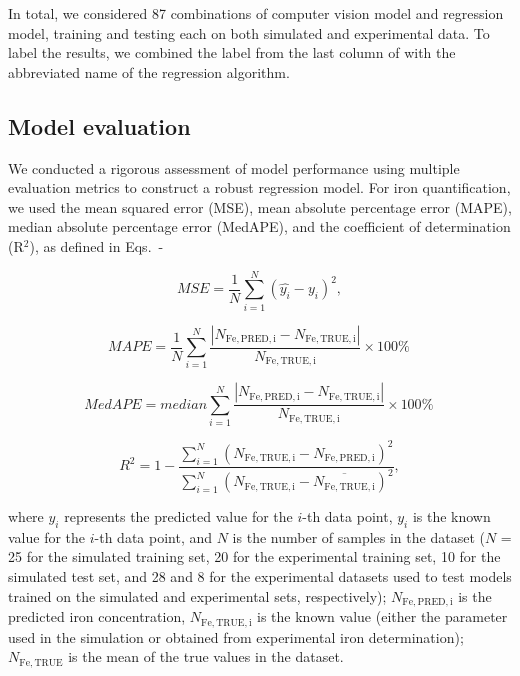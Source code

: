 \documentclass[10pt]{iopart}
\begin{document}
In total, we considered 87 combinations of computer vision model and regression model, training and testing each on both simulated and experimental data. 
To label the results, we combined the label from the last column of  with the abbreviated name of the regression algorithm.

\subsection{Model evaluation}\label{subsec:ModEva}

We conducted a rigorous assessment of model performance using multiple evaluation metrics to construct a robust regression model. 
For iron quantification, we used the mean squared error (MSE), mean absolute percentage error (MAPE), median absolute percentage error (MedAPE), and the coefficient of determination (R$^2$), as defined in Eqs.~-~

\begin{equation}\label{eqMSE}
  MSE = \frac{1}{N}\displaystyle\sum_{i=1}^{N} (\hat{y_i}-y_i)^2,
\end{equation}

\begin{equation}\label{eqMAPE}
  MAPE = \frac{1}{N}\displaystyle\sum_{i=1}^{N} \frac{|N_\mathrm{Fe,PRED,i}-N_\mathrm{Fe,TRUE,i}|}{N_\mathrm{Fe,TRUE,i}}\times 100 \%\,
\end{equation}

\begin{equation}\label{eqMedAPE}
  MedAPE = median\displaystyle\sum_{i=1}^{N} \frac{|N_\mathrm{Fe,PRED,i}-N_\mathrm{Fe,TRUE,i}|}{N_\mathrm{Fe,TRUE,i}}\times 100 \%\,
\end{equation}

\begin{equation}\label{eqR2}
  R^2 = 1-\frac{\displaystyle\sum_{i=1}^{N} (N_\mathrm{Fe,TRUE,i}-N_\mathrm{Fe,PRED,i})^2}{\displaystyle\sum_{i=1}^{N} (N_\mathrm{Fe,TRUE,i}-\overline{{N_\mathrm{Fe,TRUE,i}}})^2},
\end{equation}

where $\hat{y_i}$ represents the predicted value for the $i$-th data point, $y_i$ is the known value for the $i$-th data point, and $N$ is the number of samples in the dataset ($N$ = 25 for the simulated training set, 20 for the experimental training set, 10 for the simulated test set, and 28 and 8 for the experimental datasets used to test models trained on the simulated and experimental sets, respectively);
$N_\mathrm{Fe,PRED,i}$ is the predicted iron concentration, $N_\mathrm{Fe,TRUE,i}$ is the known value (either the parameter used in the simulation or obtained from experimental iron determination); $N_\mathrm{Fe,TRUE}$ is the mean of the true values in the dataset.
\end{document}
